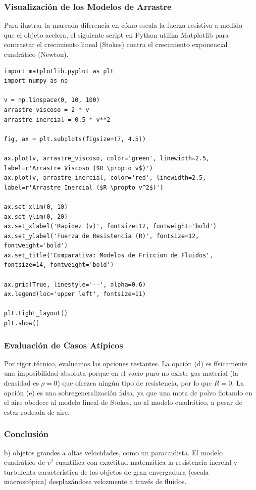 \documentclass[12pt]{article}
\begin{document}
\subsubsection*{Visualización de los Modelos de Arrastre}
Para ilustrar la marcada diferencia en cómo escala la fuerza resistiva a medida que el objeto acelera, el siguiente script en Python utiliza Matplotlib para contrastar el crecimiento lineal (Stokes) contra el crecimiento exponencial cuadrático (Newton).

\begin{lstlisting}
import matplotlib.pyplot as plt
import numpy as np

v = np.linspace(0, 10, 100)
arrastre_viscoso = 2 * v          
arrastre_inercial = 0.5 * v**2    

fig, ax = plt.subplots(figsize=(7, 4.5))

ax.plot(v, arrastre_viscoso, color='green', linewidth=2.5, label=r'Arrastre Viscoso ($R \propto v$)')
ax.plot(v, arrastre_inercial, color='red', linewidth=2.5, label=r'Arrastre Inercial ($R \propto v^2$)')

ax.set_xlim(0, 10)
ax.set_ylim(0, 20)
ax.set_xlabel('Rapidez (v)', fontsize=12, fontweight='bold')
ax.set_ylabel('Fuerza de Resistencia (R)', fontsize=12, fontweight='bold')
ax.set_title('Comparativa: Modelos de Friccion de Fluidos', fontsize=14, fontweight='bold')

ax.grid(True, linestyle='--', alpha=0.6)
ax.legend(loc='upper left', fontsize=11)

plt.tight_layout()
plt.show()
\end{lstlisting}

\subsubsection*{Evaluación de Casos Atípicos}
Por rigor técnico, evaluamos las opciones restantes. La opción (d) es físicamente una imposibilidad absoluta porque en el vacío puro no existe gas material (la densidad es $\rho = 0$) que ofrezca ningún tipo de resistencia, por lo que $R=0$. La opción (e) es una sobregeneralización falsa, ya que una mota de polvo flotando en el aire obedece al modelo lineal de Stokes, no al modelo cuadrático, a pesar de estar rodeada de aire.

\subsubsection*{Conclusión}
b) objetos grandes a altas velocidades, como un paracaidista. El modelo cuadrático de $v^2$ cuantifica con exactitud matemática la resistencia inercial y turbulenta característica de los objetos de gran envergadura (escala macroscópica) desplazándose velozmente a través de fluidos.
\end{document}
